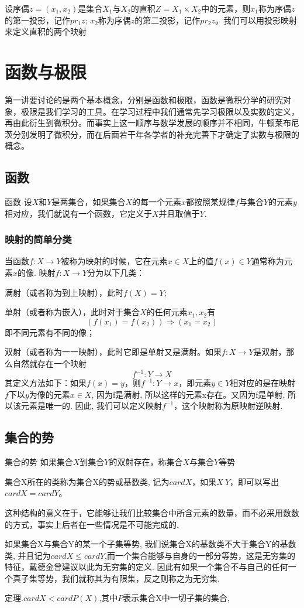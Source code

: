 设序偶$z=(x_1,x_2)$是集合$X_1$与$X_2$的直积$Z=X_1\times X_2$中的元素，则$x_1$称为序偶$z$的第一投影，记作$pr_1z$; $x_2$称为序偶$z$的第二投影，记作$pr_2z$。我们可以用投影映射来定义直积的两个映射


\section{函数与极限}
第一讲要讨论的是两个基本概念，分别是函数和极限，函数是微积分学的研究对象，极限是我们学习的工具。在学习过程中我们通常先学习极限以及实数的定义，再由此衍生到微积分。而事实上这一顺序与数学发展的顺序并不相同，牛顿莱布尼茨分别发明了微积分，而在后面若干年各学者的补充完善下才确定了实数与极限的概念。
\subsection{函数}
\begin{definition}{函数}{}
设$X$和$Y$是两集合，如果集合$X$的每一个元素$x$都按照某规律$f$与集合$Y$的元素$y$相对应，我们就说有一个函数，它定义于$X$并且取值于$Y$. 
\end{definition}
\subsubsection{映射的简单分类}
当函数$f:X\rightarrow Y$被称为映射的时候，它在元素$x\in X$上的值$f(x)\in Y$通常称为元素$x$的像. 
映射$f:X\rightarrow Y$分为以下几类：

满射（或者称为到上映射），此时$f(X)=Y$; 

单射（或者称为嵌入），此时对于集合$X$的任何元素$x_1,x_2$有
\[(f(x_1)=f(x_2))\Rightarrow (x_1=x_2)\]
即不同元素有不同的像；

双射（或者称为一一映射），此时它即是单射又是满射。如果$f:X\rightarrow Y$是双射，那么自然就存在一个映射
\[f^{-1}:Y\rightarrow X\]
其定义方法如下：如果$f(x)=y$，则$f^{-1}:Y\rightarrow x$，即元素$y\in Y$相对应的是在映射$f$下以$y$为像的元素$x\in X$, 因为f是满射, 所以这样的元素x存在。又因为f是单射, 所以该元素是唯一的. 因此, 我们可以定义映射$f^{-1}$，这个映射称为原映射逆映射. 
\subsection{集合的势}
\begin{definition}{集合的势}{}
如果集合$X$到集合$Y$的双射存在，称集合$X$与集合$Y$等势
\end{definition}
集合X所在的类称为集合X的势或基数类, 记为$cardX$，如果$X~Y$，即可以写出$cardX=cardY$。

这种结构的意义在于，它能够让我们比较集合中所含元素的数量，而不必采用数数的方式，事实上后者在一些情况是不可能完成的. 

如果集合X与集合Y的某一个子集等势, 我们说集合X的基数类不大于集合Y的基数类, 并且记为$cardX\leq cardY$,而一个集合能够与自身的一部分等势，这是无穷集的特征，戴德金曾建议以此为无穷集的定义. 因此有如果一个集合不与自己的任何一个真子集等势，我们就称其为有限集，反之则称之为无穷集. 

定理.$cardX<cardP(X)$,其中$P$表示集合X中一切子集的集合,